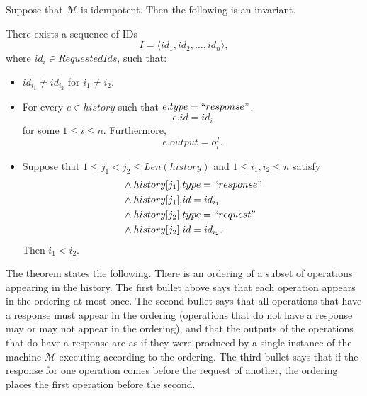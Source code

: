 \documentclass[12pt,a4paper,en]{pracamgr}
\newcommand{\mc}[1]{\mathcal{#1}}
\begin{document}
\begin{thm}[Linearizability]\label{thm-linear}
    Suppose that $\mc M$ is idempotent. Then the following is an invariant.

    There exists a sequence of IDs
    $$ I = \langle id_1, id_2, \dots, id_n\rangle , $$
    where $id_i \in RequestedIds$, such that:
    \begin{itemize}
        \item $id_{i_1} \neq id_{i_2}$ for $i_1 \neq i_2$.
        \item For every $e \in history$ such that $e.type = ``response"$,
            $$e.id = id_i$$
            for some $1 \le i \le n$. Furthermore,
            $$ e.output = o_i^I. $$
        \item Suppose that $1 \le j_1 < j_2 \le Len(history)$ and $1 \le i_1, i_2 \le n$ satisfy
            \begin{align*}
                & \land history[j_1].type = ``response"\\
                & \land history[j_1].id = id_{i_1}\\
                & \land history[j_2].type = ``request"\\
                & \land history[j_2].id = id_{i_2}.
            \end{align*}
            Then $i_1 < i_2$.
    \end{itemize}
\end{thm}
The theorem states the following. There is an ordering of a subset of operations appearing in the history. The first bullet above says that each operation appears in the ordering at most once. The second bullet says that all operations that have a response must appear in the ordering (operations that do not have a response may or may not appear in the ordering), and that the outputs of the operations that do have a response are as if they were produced by a single instance of the machine $\mc M$ executing according to the ordering. The third bullet says that if the response for one operation comes before the request of another, the ordering places the first operation before the second.
\end{document}
